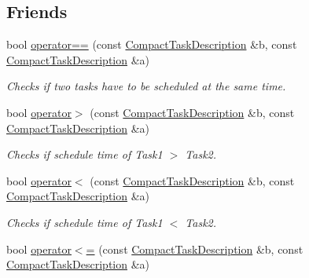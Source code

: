 \subsection*{Friends}
\begin{DoxyCompactItemize}
\item 
bool \hyperlink{classpc__emulator_1_1CompactTaskDescription_ab45fcbfe7ad52ba066a86a673106a8d0}{operator==} (const \hyperlink{classpc__emulator_1_1CompactTaskDescription}{Compact\+Task\+Description} \&b, const \hyperlink{classpc__emulator_1_1CompactTaskDescription}{Compact\+Task\+Description} \&a)\hypertarget{classpc__emulator_1_1CompactTaskDescription_ab45fcbfe7ad52ba066a86a673106a8d0}{}\label{classpc__emulator_1_1CompactTaskDescription_ab45fcbfe7ad52ba066a86a673106a8d0}

\begin{DoxyCompactList}\small\item\em Checks if two tasks have to be scheduled at the same time. \end{DoxyCompactList}\item 
bool \hyperlink{classpc__emulator_1_1CompactTaskDescription_a8fdf5197fa14af3cf454a5ae102a9ccc}{operator$>$} (const \hyperlink{classpc__emulator_1_1CompactTaskDescription}{Compact\+Task\+Description} \&b, const \hyperlink{classpc__emulator_1_1CompactTaskDescription}{Compact\+Task\+Description} \&a)\hypertarget{classpc__emulator_1_1CompactTaskDescription_a8fdf5197fa14af3cf454a5ae102a9ccc}{}\label{classpc__emulator_1_1CompactTaskDescription_a8fdf5197fa14af3cf454a5ae102a9ccc}

\begin{DoxyCompactList}\small\item\em Checks if schedule time of Task1 $>$ Task2. \end{DoxyCompactList}\item 
bool \hyperlink{classpc__emulator_1_1CompactTaskDescription_a7a06e42b167fe16371403e0b3584c55c}{operator$<$} (const \hyperlink{classpc__emulator_1_1CompactTaskDescription}{Compact\+Task\+Description} \&b, const \hyperlink{classpc__emulator_1_1CompactTaskDescription}{Compact\+Task\+Description} \&a)\hypertarget{classpc__emulator_1_1CompactTaskDescription_a7a06e42b167fe16371403e0b3584c55c}{}\label{classpc__emulator_1_1CompactTaskDescription_a7a06e42b167fe16371403e0b3584c55c}

\begin{DoxyCompactList}\small\item\em Checks if schedule time of Task1 $<$ Task2. \end{DoxyCompactList}\item 
bool \hyperlink{classpc__emulator_1_1CompactTaskDescription_a0af4ab09a527a01f5f64bb44181294ed}{operator$<$=} (const \hyperlink{classpc__emulator_1_1CompactTaskDescription}{Compact\+Task\+Description} \&b, const \hyperlink{classpc__emulator_1_1CompactTaskDescription}{Compact\+Task\+Description} \&a)\hypertarget{classpc__emulator_1_1CompactTaskDescription_a0af4ab09a527a01f5f64bb44181294ed}{}\label{classpc__emulator_1_1CompactTaskDescription_a0af4ab09a527a01f5f64bb44181294ed}


\end{DoxyCompactItemize}
